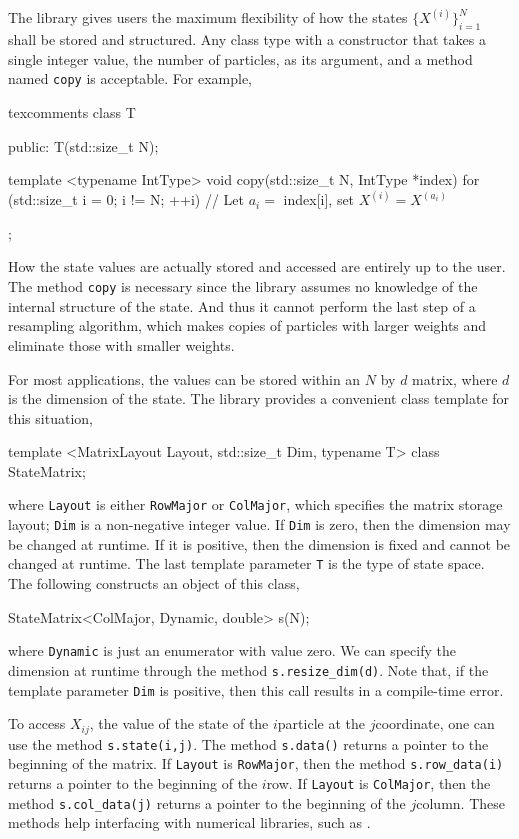 The library gives users the maximum flexibility of how the states
$\{X^{(i)}\}_{i=1}^N$ shall be stored and structured. Any class type with a
constructor that takes a single integer value, the number of particles, as its
argument, and a method named \verb|copy| is acceptable. For example,
\begin{cppcode*}{texcomments}
  class T
  {
      public:
      T(std::size_t N);

      template <typename IntType>
      void copy(std::size_t N, IntType *index)
      {
          for (std::size_t i = 0; i != N; ++i) {
              // Let $a_i =$ index[i], set $X^{(i)} = X^{(a_i)}$
          }
      }
  };
\end{cppcode*}
How the state values are actually stored and accessed are entirely up to the
user. The method \verb|copy| is necessary since the library assumes no
knowledge of the internal structure of the state. And thus it cannot perform
the last step of a resampling algorithm, which makes copies of particles with
larger weights and eliminate those with smaller weights.

For most applications, the values can be stored within an $N$ by $d$ matrix,
where $d$ is the dimension of the state. The library provides a convenient
class template for this situation,
\begin{cppcode}
  template <MatrixLayout Layout, std::size_t Dim, typename T>
  class StateMatrix;
\end{cppcode}
where \verb|Layout| is either \verb|RowMajor| or \verb|ColMajor|, which
specifies the matrix storage layout; \verb|Dim| is a non-negative integer
value. If \verb|Dim| is zero, then the dimension may be changed at runtime. If
it is positive, then the dimension is fixed and cannot be changed at runtime.
The last template parameter \verb|T| is the \cpp type of state space. The
following constructs an object of this class,
\begin{cppcode}
  StateMatrix<ColMajor, Dynamic, double> s(N);
\end{cppcode}
where \verb|Dynamic| is just an enumerator with value zero. We can specify the
dimension at runtime through the method \verb|s.resize_dim(d)|. Note that, if
the template parameter \verb|Dim| is positive, then this call results in a
compile-time error.

To access $X_{ij}$, the value of the state of the $i$\ith particle at the
$j$\ith coordinate, one can use the method \verb|s.state(i,j)|. The method
\verb|s.data()| returns a pointer to the beginning of the matrix. If
\verb|Layout| is \verb|RowMajor|, then the method \verb|s.row_data(i)| returns
a pointer to the beginning of the $i$\ith row. If \verb|Layout| is
\verb|ColMajor|, then the method \verb|s.col_data(j)| returns a pointer to the
beginning of the $j$\ith column. These methods help interfacing with numerical
libraries, such as \blas.

